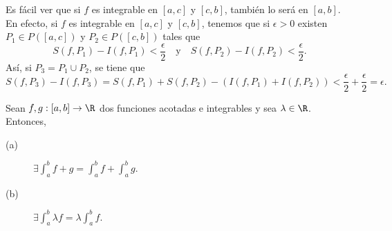 \begin{observation}
	\normalfont Es fácil ver que si $\displaystyle f $ es integrable en $\displaystyle \left[a,c\right]  $ y $\displaystyle \left[c,b\right]  $, también lo será en $\displaystyle \left[a,b\right]  $. En efecto, si $\displaystyle f $ es integrable en $\displaystyle \left[a,c\right]  $ y $\displaystyle \left[c,b\right]  $, tenemos que si $\displaystyle \epsilon > 0 $ existen $\displaystyle P_{1} \in P\left(\left[a,c\right] \right) $ y $\displaystyle P_{2} \in P\left(\left[c,b\right] \right) $ tales que
	\[ S\left(f,P_{1}\right)-I\left(f,P_{1}\right) < \frac{\epsilon }{2} \quad \text{y} \quad S\left(f,P_{2}\right)-I\left(f,P_{2}\right) < \frac{\epsilon }{2} .\]
	Así, si $\displaystyle P_{3} = P_{1} \cup P_{2} $, se tiene que
	\[ S\left(f,P_{3}\right)-I\left(f,P_{3}\right) = S\left(f,P_{1}\right) + S\left(f,P_{2}\right)-\left(I\left(f,P_{1}\right) + I\left(f,P_{2}\right)\right) < \frac{\epsilon }{2} + \frac{\epsilon }{2} = \epsilon.\]
\end{observation}
\begin{ftheorem}[]
	\normalfont Sean $\displaystyle f,g : \left[a,b\right]  \to \R $ dos funciones acotadas e integrables y sea $\displaystyle \lambda \in \R $. Entonces,
	\begin{description}
	\item[(a)] $\displaystyle \exists \int^{b}_{a} f + g = \int^{b}_{a} f + \int^{b}_{a} g $.
	\item[(b)] $\displaystyle \exists \int^{b}_{a} \lambda f = \lambda \int^{b}_{a} f $.
	\end{description}
\end{ftheorem}
